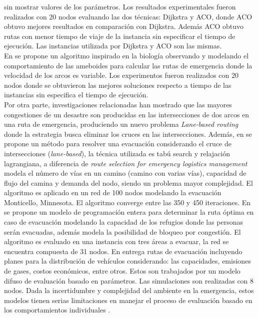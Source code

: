 sin mostrar valores de los parámetros. Los resultados experimentales fueron realizados con 20 nodos evaluando las dos técnicas: Dijkstra y ACO, donde ACO obtuvo mejores resultados en comparación con Dijkstra. Además ACO obtuvo rutas con menor tiempo de viaje de la instancia sin especificar el tiempo de ejecución. Las instancias utilizada por Dijkstra y ACO son las mismas.\\
En \cite{zhang2013route} se propone un algoritmo inspirado en la biología observando y modelando el comportamiento de las ameboides para calcular las rutas de emergencia donde la velocidad de los arcos es variable. Los experimentos fueron realizados con 20 nodos donde se obtuvieron las mejores soluciones respecto a tiempo de las instancias sin especifica el tiempo de ejecución.\\
Por otra parte, investigaciones relacionadas \cite{southworth1991regional,cova2003network} han mostrado que las mayores congestiones de un desastre son producidas en las intersecciones de dos arcos en una ruta de emergencia, produciendo un nuevo problema \textit{Lane-based routing} donde la estrategia busca eliminar los cruces en las intersecciones. 
Además, en \cite{xie2011lane} se propone un método para resolver una evacuación considerando el cruce de intersecciones (\textit{lane-based}), la técnica utilizada es tabú search y relajación lagrangiana, a diferencia de \textit{route selection for emergency logistics management} modela el número de vías en un camino (camino con varias vías), capacidad de flujo del camina y demanda del nodo, siendo un problema mayor complejidad. El algoritmo es aplicado en un red de 100 nodos modelando la evacuación Monticello, Minnesota. El algoritmo converge entre las 350 y 450 iteraciones.
En \cite{stepanov2009multi} se propone un modelo de programación entera para determinar la ruta óptima en caso de evacuación modelando la capacidad de los refugios donde las personas serán evacuadas, además modela la posibilidad de bloqueo por congestión. El algoritmo es evaluado en una instancia con tres áreas a evacuar, la red se encuentra compuesta de 31 nodos.
En \cite{tan2011if} entrega rutas de evacuación incluyendo planes para la distribución de vehículos considerando: las capacidades, emisiones de gases, costos económicos, entre otros. Estos son trabajados por un modelo difuso de evaluación basado en parámetros. Las simulaciones son realizadas con 8 nodos. Dada la incertidumbre y complejidad del ambiente en la emergencia, estos modelos tienen serias limitaciones en manejar el proceso de evaluación basado en los comportamientos individuales \cite{liu2016evacuation}.\\

